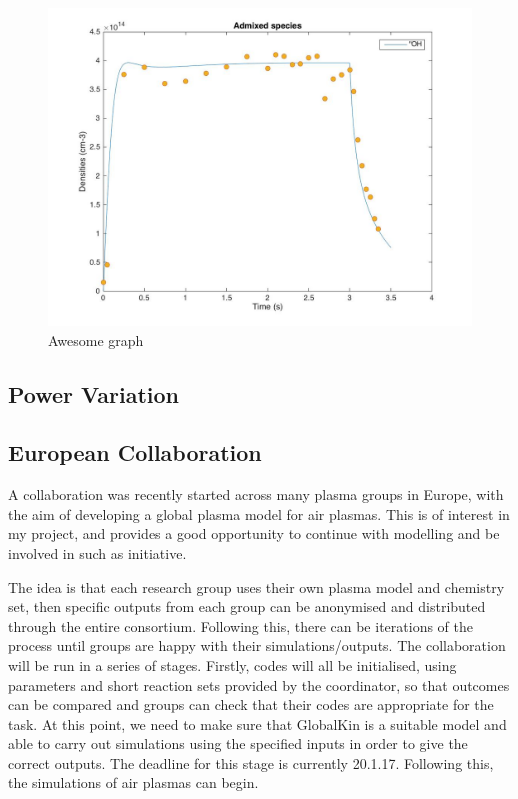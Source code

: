 \documentclass[11pt, oneside]{article}   	%
\begin{document}
\begin{figure}
\includegraphics[width=\textwidth]{Figures/Spatial}
\caption{Awesome graph}
\end{figure}

\subsection{Power Variation}


\subsection{European Collaboration}
A collaboration was recently started across many plasma groups in Europe, with the aim of developing a global plasma model for air plasmas.
This is of interest in my project, and provides a good opportunity to continue with modelling and be involved in such as initiative.

The idea is that each research group uses their own plasma model and chemistry set, then specific outputs from each group can be anonymised and distributed through the entire consortium.
Following this, there can be iterations of the process until groups are happy with their simulations/outputs.
The collaboration will be run in a series of stages.
Firstly, codes will all be initialised, using parameters and short reaction sets provided by the coordinator, so that outcomes can be compared and groups can check that their codes are appropriate for the task.
At this point, we need to make sure that GlobalKin is a suitable model and able to carry out simulations using the specified inputs in order to give the correct outputs.
The deadline for this stage is currently 20.1.17.
Following this, the simulations of air plasmas can begin.
\end{document}
